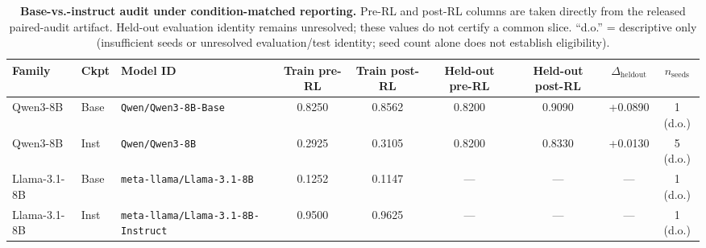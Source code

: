 \begin{table}[t]
\centering
\caption{\textbf{Base-vs.-instruct audit under condition-matched reporting.}
Pre-RL and post-RL columns are taken directly from the released paired-audit
artifact. Held-out evaluation identity remains unresolved; these values do not certify a common slice. ``d.o.'' = descriptive only (insufficient seeds or unresolved
evaluation/test identity; seed count alone does not establish eligibility).}
\label{tab:paired-bi}
\small
\begin{tabular}{@{}l l l c c c c c c@{}}
\toprule
\textbf{Family} & \textbf{Ckpt} & \textbf{Model ID} &
\textbf{Train pre-RL} & \textbf{Train post-RL} &
\textbf{Held-out pre-RL} & \textbf{Held-out post-RL} &
\textbf{$\Delta_{\mathrm{heldout}}$} & \textbf{$n_{\text{seeds}}$} \\
\midrule
Qwen3-8B     & Base & \texttt{Qwen/Qwen3-8B-Base}      & 0.8250 & 0.8562 & 0.8200 & 0.9090 & +0.0890 & 1 (d.o.) \\
Qwen3-8B     & Inst & \texttt{Qwen/Qwen3-8B}           & 0.2925 & 0.3105 & 0.8200 & 0.8330 & +0.0130 & 5 (d.o.) \\
Llama-3.1-8B & Base & \texttt{meta-llama/Llama-3.1-8B} & 0.1252 & 0.1147 & ---    & ---    & ---     & 1 (d.o.) \\
Llama-3.1-8B & Inst & \texttt{meta-llama/Llama-3.1-8B-Instruct} & 0.9500 & 0.9625 & --- & --- & --- & 1 (d.o.) \\
\bottomrule
\end{tabular}
\end{table}

